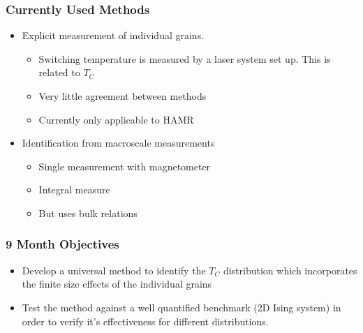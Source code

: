 \documentclass{beamer}
\begin{document}
\begin{frame}
	\frametitle{Currently Used Methods}
	\vspace{4mm}
	\begin{itemize}
		\item{Explicit measurement of individual grains.\footnotemark[3]}
		\begin{itemize}
			\item{Switching temperature is measured by a laser system set up. This is related to $T_C$}
			\item{Very little agreement between methods}
			\item{Currently only applicable to HAMR}
		\end{itemize}
		\vspace{4mm}
		\item{Identification from macroscale measurements\footnotemark[4]}
		\begin{itemize}
			\item{Single measurement with magnetometer}
			\item{Integral measure}
			\item{But uses bulk relations}
		\end{itemize}
	\end{itemize}	
\end{frame}

\begin{frame}
	\frametitle{9 Month Objectives}
	\begin{itemize}
		\item{Develop a universal method to identify the $T_C$ distribution which incorporates the finite size effects of the individual grains\newline}
		\item{Test the method against a well quantified benchmark (2D Ising system) in order to verify it's effectiveness for different distributions.\newline}
	\end{itemize}
\end{frame}
\end{document}
